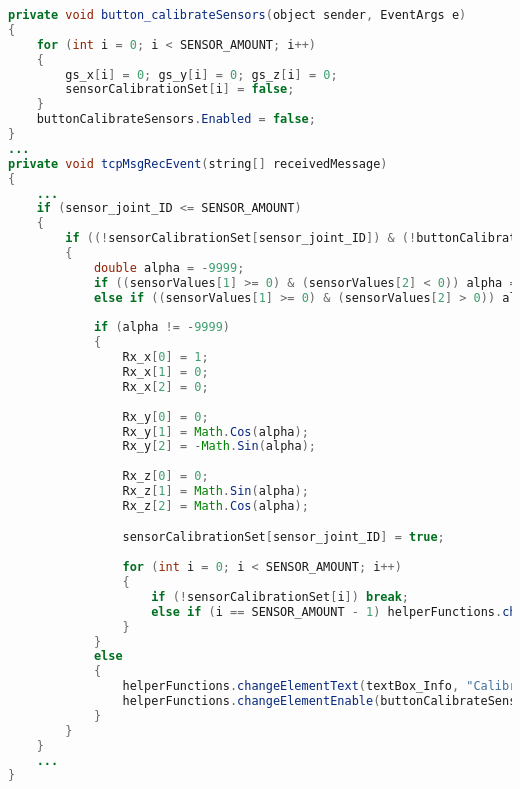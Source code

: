 \label{lst:calibrateSensor}
\begin{lstlisting}[language=Java, caption=Sensoren kalibrieren]
private void button_calibrateSensors(object sender, EventArgs e)
{
	for (int i = 0; i < SENSOR_AMOUNT; i++)
	{
		gs_x[i] = 0; gs_y[i] = 0; gs_z[i] = 0;
		sensorCalibrationSet[i] = false;
	}
	buttonCalibrateSensors.Enabled = false;
}
...
private void tcpMsgRecEvent(string[] receivedMessage)
{
	...
	if (sensor_joint_ID <= SENSOR_AMOUNT)
	{
		if ((!sensorCalibrationSet[sensor_joint_ID]) & (!buttonCalibrateSensors.Enabled))
		{
			double alpha = -9999;
			if ((sensorValues[1] >= 0) & (sensorValues[2] < 0)) alpha = -(Math.PI / 2) + Math.Acos((sensorValues[1] * GRAVITATION_EARTH) / GRAVITATION_EARTH);
			else if ((sensorValues[1] >= 0) & (sensorValues[2] > 0)) alpha = (Math.PI / 2) - Math.Acos((sensorValues[1] * GRAVITATION_EARTH) / GRAVITATION_EARTH);
			
			if (alpha != -9999)
			{
				Rx_x[0] = 1;
				Rx_x[1] = 0;
				Rx_x[2] = 0;
				
				Rx_y[0] = 0;
				Rx_y[1] = Math.Cos(alpha);
				Rx_y[2] = -Math.Sin(alpha);
				
				Rx_z[0] = 0;
				Rx_z[1] = Math.Sin(alpha);
				Rx_z[2] = Math.Cos(alpha);

				sensorCalibrationSet[sensor_joint_ID] = true;
				
				for (int i = 0; i < SENSOR_AMOUNT; i++)
				{
					if (!sensorCalibrationSet[i]) break;
					else if (i == SENSOR_AMOUNT - 1) helperFunctions.changeElementEnable(buttonCalibrateSensors, true);
				}			
			}
			else
			{
				helperFunctions.changeElementText(textBox_Info, "Calibration failed!", true);
				helperFunctions.changeElementEnable(buttonCalibrateSensors, true);
			}
		}
	}
	...
}
\end{lstlisting}